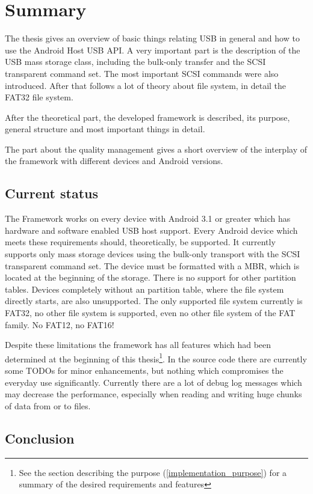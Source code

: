 \chapter{Summary}

The thesis gives an overview of basic things relating USB in general and how to use the Android Host USB API. A very important part is the description of the USB mass storage class, including the bulk-only transfer and the SCSI transparent command set. The most important SCSI commands were also introduced. After that follows a lot of theory about file system, in detail the FAT32 file system.

After the theoretical part, the developed framework is described, its purpose, general structure and most important things in detail.

The part about the quality management gives a short overview of the interplay of the framework with different devices and Android versions.

\section{Current status}

The Framework works on every device with Android 3.1 or greater which has hardware and software enabled USB host support. Every Android device which meets these requirements should, theoretically, be supported. It currently supports only mass storage devices using the bulk-only transport with the SCSI transparent command set. The device must be formatted with a MBR, which is located at the beginning of the storage. There is no support for other partition tables. Devices completely without an partition table, where the file system directly starts, are also unsupported. The only supported file system currently is FAT32, no other file system is supported, even no other file system of the FAT family. No FAT12, no FAT16!

Despite these limitations the framework has all features which had been determined at the beginning of this thesis\footnote{See the section describing the purpose (\ref{implementation_purpose}) for a summary of the desired requirements and features}. In the source code there are currently some TODOs for minor enhancements, but nothing which compromises the everyday use significantly. Currently there are a lot of debug log messages which may decrease the performance, especially when reading and writing huge chunks of data from or to files.

\section{Conclusion}

